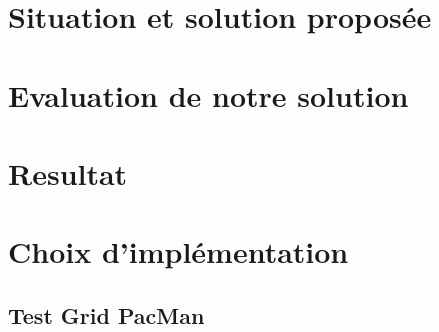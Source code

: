 \documentclass{article}
\begin{document}


\tableofcontents \label{contents}


\section{Situation et solution proposée}

\section{Evaluation de notre solution}

\section{Resultat}

\section{Choix d'implémentation}

\subsection{Test Grid PacMan}

\noindent
{}


\end{document}
